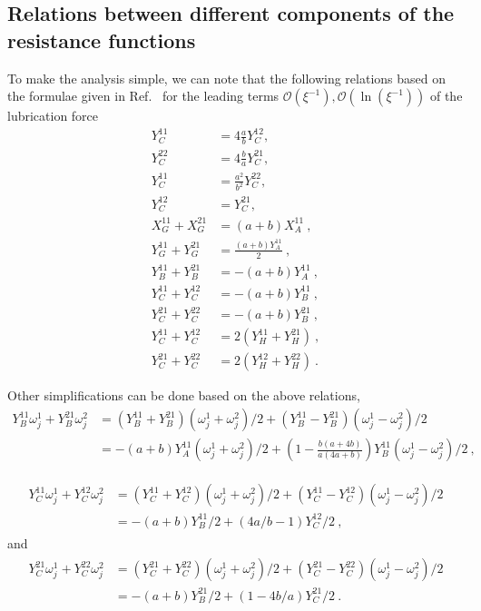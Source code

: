 \documentclass[reprint, amsmath,amssymb,aps,pre,onecolumn,notitlepage%
]{revtex4-1}
\begin{document}
\subsection{Relations between different components of the resistance functions}
\label{sec:relate}

To make the analysis simple, we can note that the following relations based on the formulae given in Ref.~\cite{KK1991} for the leading terms $\mathcal{O}(\xi^{-1}),\mathcal{O}(\ln(\xi^{-1}))$ of the lubrication force
\begin{equation}
\begin{split}
	Y^{11}_C &=4\frac{a}{b}Y^{12}_C,\\
	Y^{22}_C &=4\frac{b}{a}Y^{21}_C,\\ 
	Y^{11}_C &=\frac{a^2}{b^2}Y^{22}_C,\\
	Y^{12}_C &=Y^{21}_C,\\
	X^{11}_G+ X^{21}_G&=(a+b)X_A^{11} \ , \\
	Y^{11}_G+ Y^{21}_G&=\frac{(a+b)Y_A^{11}}{2} \ , \\
	Y^{11}_B+ Y^{21}_B&=-(a+b)Y_A^{11} \ ,\\ 
	Y^{11}_C+ Y^{12}_C&=-(a+b)Y^{11}_B\ , \\ 
	Y^{21}_C+ Y^{22}_C&=-(a+b)Y^{21}_B\ ,\\ 
	Y^{11}_C+ Y^{12}_C&=2(Y^{11}_H+Y^{21}_H) \ , \\
	Y^{21}_C+ Y^{22}_C&=2(Y^{12}_H+Y^{22}_H) \ . 
\label{eq:relations}
\end{split}
\end{equation}

Other simplifications can be done based on the above relations, 
\begin{align}
	Y_B^{11}\omega^1_j+Y_B^{21}\omega^2_j&=(Y_B^{11}+Y_B^{21})(\omega_j^1+\omega^2_j)/2+(Y_B^{11}-Y_B^{21})(\omega_j^1-\omega^2_j)/2\\
	&=-(a+b)Y_A^{11}(\omega_j^1+\omega^2_j)/2+(1-\frac{b(a+4b)}{a(4 a +b)})Y_B^{11}(\omega_j^1-\omega^2_j)/2\ ,
	\label{eq:ybsimp}
\end{align}

\begin{align}
\begin{split}
Y_C^{11}\omega^1_j+Y_C^{12}\omega^2_j&=(Y_C^{11}+Y_C^{12})(\omega^1_j+\omega^2_j)/2+(Y_C^{11}-Y_C^{12})(\omega^1_j-\omega^2_j)/2\\
&=-(a+b)Y_B^{11}/2+(4a/b-1)Y_C^{12}/2 \ ,
\end{split}
	\label{eq:ycsimp}
\end{align}
and
\begin{align}
\begin{split}
Y_C^{21}\omega^1_j+Y_C^{22}\omega^2_j&=(Y_C^{21}+Y_C^{22})(\omega^1_j+\omega^2_j)/2+(Y_C^{21}-Y_C^{22})(\omega^1_j-\omega^2_j)/2\\
&=-(a+b)Y_B^{21}/2+(1-4b/a)Y_C^{21}/2 \ .
\end{split}
	\label{eq:ycsimp2}
\end{align}
\end{document}
